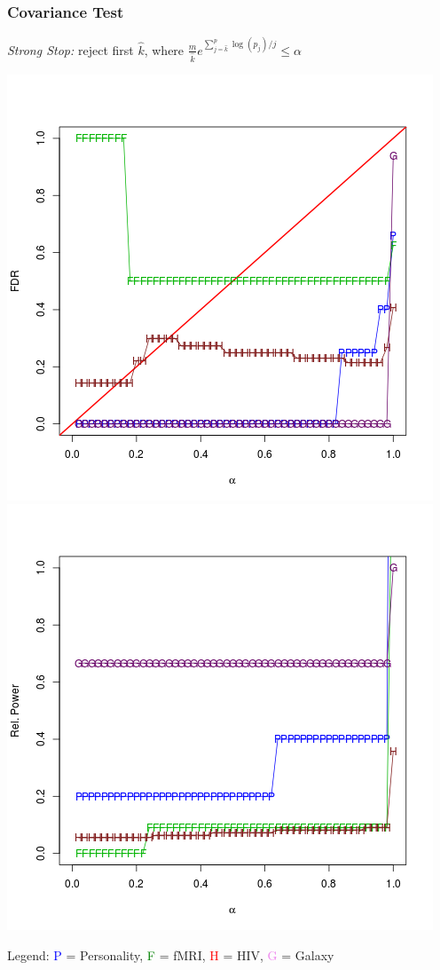 \documentclass{beamer}
\begin{document}
\begin{frame}
\frametitle{Covariance Test}
\emph{Strong Stop:} reject first $\hat{k}$, where $\frac{m}{\hat{k}}e^{\sum_{j=\hat{k}}^{p} \log(p_j)/j} \leq \alpha$

\begin{center}
\includegraphics[scale = 0.3]{res_c_ss_type1.png}
\includegraphics[scale = 0.3]{res_c_ss_power.png}
\end{center}

Legend: \textcolor{blue}{P} = Personality, \textcolor{green}{F} = fMRI,
\textcolor{red}{H} = HIV, \textcolor{violet}{G} = Galaxy
\end{frame}
\end{document}
